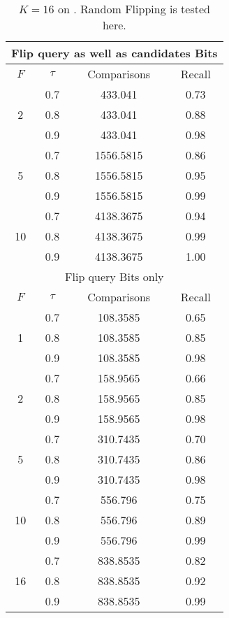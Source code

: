 \documentclass[11pt]{article}
\begin{document}
\begin{table}
\centering
\begin{tabular}{|c|c|c|c|}
\hline
\multicolumn{4}{c}{Flip query as well as candidates Bits} \\
\hline
$F$ & $\tau$ & Comparisons & Recall \\
\hline
\multirow{3}{*}{2} & 0.7 & 433.041 & 0.73 \\
 & 0.8 & 433.041 & 0.88 \\
 & 0.9 & 433.041 & 0.98 \\
\hline
\multirow{3}{*}{5} & 0.7 & 1556.5815 & 0.86 \\
 & 0.8 & 1556.5815 & 0.95 \\
 & 0.9 & 1556.5815 & 0.99 \\
\hline
\multirow{3}{*}{10} & 0.7 & 4138.3675 & 0.94 \\
 & 0.8 & 4138.3675 & 0.99 \\
 & 0.9 & 4138.3675 & 1.00 \\
\hline 
\multicolumn{4}{c}{Flip query Bits only} \\
\hline
$F$ & $\tau$ & Comparisons & Recall \\
\hline
\multirow{3}{*}{1}  & 0.7 & 108.3585 & 0.65 \\
 & 0.8 & 108.3585 & 0.85 \\
  & 0.9 & 108.3585 & 0.98 \\
\hline
\multirow{3}{*}{2} & 0.7 & 158.9565 & 0.66 \\
 & 0.8 & 158.9565 & 0.85 \\
 & 0.9 & 158.9565 & 0.98 \\
\hline
\multirow{3}{*}{5} & 0.7 & 310.7435 & 0.70 \\
 & 0.8 & 310.7435 & 0.86 \\
 & 0.9 & 310.7435 & 0.98 \\
\hline
\multirow{3}{*}{10} & 0.7 & 556.796 & 0.75 \\
 & 0.8 & 556.796 & 0.89 \\
 & 0.9 & 556.796 & 0.99 \\
\hline
\multirow{3}{*}{16} & 0.7 & 838.8535 & 0.82 \\
 & 0.8 & 838.8535 & 0.92 \\
& 0.9 & 838.8535 & 0.99 \\
\hline
\end{tabular}
\caption{\footnotesize{$K=16$ on \aol. Random Flipping is tested here.}}
\label{tab:data-so}
\end{table}
\end{document}
